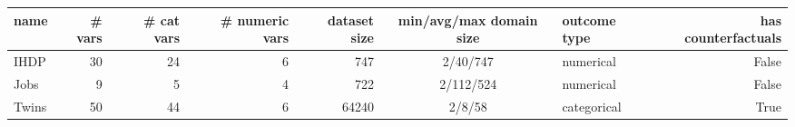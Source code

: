 \begin{tabular}{lrrrrclr}
\toprule
name & \# vars & \# cat vars & \# numeric vars & dataset size & min/avg/max domain size & outcome type & has counterfactuals \\
\midrule
IHDP & 30 & 24 & 6 & 747 & 2/40/747 & numerical & False \\
Jobs & 9 & 5 & 4 & 722 & 2/112/524 & numerical & False \\
Twins & 50 & 44 & 6 & 64240 & 2/8/58 & categorical & True \\
\bottomrule
\end{tabular}